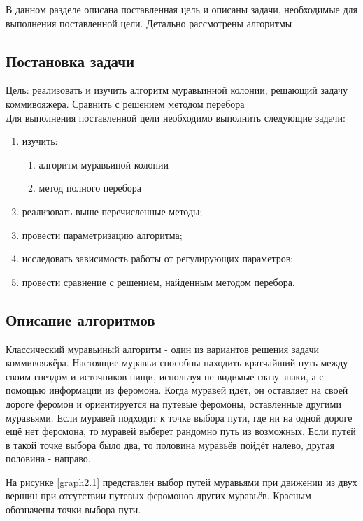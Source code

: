 \documentclass[../main.tex]{subfiles}
\begin{document}
	
	В данном разделе описана поставленная цель и описаны задачи, необходимые для выполнения поставленной цели. Детально рассмотрены алгоритмы

\subsection{Постановка задачи}

	Цель: реализовать и изучить алгоритм муравьинной колонии, решающий задачу коммивояжера. Сравнить с решением методом перебора \\
	Для выполнения поставленной цели необходимо выполнить следующие задачи:
	
	\begin{enumerate}[1)]
		\item изучить:
		\begin{enumerate}
			\item алгоритм муравьиной колонии
			\item метод полного перебора
		\end{enumerate}
		\item реализовать выше перечисленные методы;
		\item провести параметризацию алгоритма;
		\item исследовать зависимость работы от регулирующих параметров;
		\item провести сравнение с решением, найденным методом перебора.
	\end{enumerate}

\subsection{Описание алгоритмов}

	Классический муравьиный алгоритм - один из вариантов решения задачи коммивояжёра. 
	Настоящие муравьи способны находить кратчайший путь между своим гнездом и источников пищи, используя не видимые глазу знаки, а с помощью информации из феромона. 
	Когда муравей идёт, он оставляет на своей дороге феромон и ориентируется на путевые феромоны, оставленные другими муравьями. 
	Если муравей подходит к точке выбора пути, где ни на одной дороге ещё нет феромона, то муравей выберет рандомно путь из возможных. 
	Если путей в такой точке выбора было два, то половина муравьёв пойдёт налево, другая половина - направо.
	
	На рисунке \ref{graph2.1} представлен выбор путей муравьями при движении из двух вершин при отсутствии путевых феромонов других муравьёв. Красным обозначены точки выбора пути.
	
\end{document}
